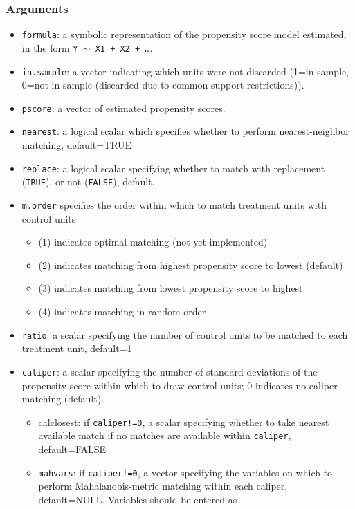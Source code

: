 \documentclass[oneside,letterpaper,titlepage]{article}
\begin{document}
\begin{appendix}
\subsubsection{Arguments}
\begin{itemize}
\item \texttt{formula}: a symbolic representation of the propensity score
  model estimated, in the form {\tt Y $\sim$ X1 + X2 + \dots}.
\item \texttt{in.sample}: a vector indicating which units were not discarded (1=in sample, 0=not in sample (discarded due to common support restrictions)). 
\item \texttt{pscore}: a vector of estimated propensity scores. 
\item \texttt{nearest}: a logical scalar which specifies whether
  to perform nearest-neighbor matching, default=TRUE 
\item \texttt{replace}: a logical scalar specifying whether to match with
  replacement (\texttt{TRUE}), or not (\texttt{FALSE}), default. 
\item \texttt{m.order}  specifies the order within which to match
  treatment units with control units
  \begin{itemize}
  \item (1) indicates optimal matching (not yet implemented)
  \item (2) indicates matching from highest propensity score to
    lowest (default)
  \item (3) indicates matching from lowest propensity score to
    highest
  \item (4) indicates matching in random order
  \end{itemize}
\item \texttt{ratio}: a scalar specifying the number of control units to be matched to
  each treatment unit, default=1
\item \texttt{caliper}: a scalar specifying the number of standard deviations of 
  the propensity score within which to draw control units; 0 indicates
  no caliper matching (default).
  \begin{itemize}
  \item{calclosest}: if \texttt{caliper!=0}, a scalar specifying whether to take nearest
    available match if no matches are available within \texttt{caliper}, default=FALSE
  \item\texttt{mahvars}: if \texttt{caliper!=0}, a vector specifying
    the variables on which to perform Mahalanobis-metric matching
    within each caliper, default=NULL.  Variables should be entered as

\end{itemize}
\end{itemize}
\end{appendix}
\end{document}
